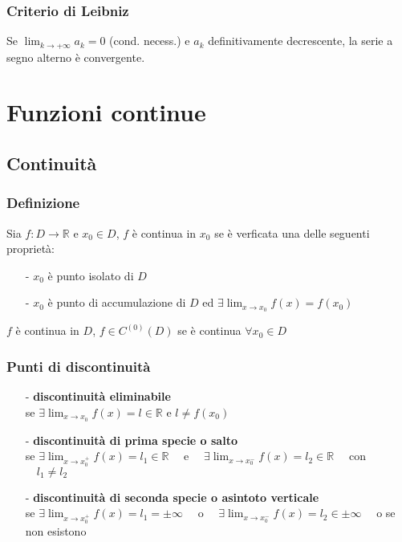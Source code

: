 \documentclass[a4paper]{article}
\newcommand\cont[2]{C^{(#1)} \left({#2}\right)}
\begin{document}
\subsubsection*{Criterio di Leibniz}
Se \(\displaystyle \lim_{k \to +\infty} a_k = 0\) (cond. necess.) e \(a_k\) definitivamente decrescente, la serie a segno alterno è convergente.

\newpage


\section{Funzioni continue}
\subsection{Continuità}
\subsubsection*{Definizione}
Sia \(f:D \to \mathbb{R}\) e \(x_0 \in D\), \(f\) è continua in \(x_0\) se è verficata una delle seguenti proprietà:
\begin{itemize}
	\item[-] \(x_0\) è punto isolato di \(D\)
	\item[-] \(x_0\) è punto di accumulazione di \(D\) ed \(\displaystyle \exists \lim_{x \to x_0} f(x) = f(x_0)\)
\end{itemize}
\(f\) è continua in \(D\), \(f \in \cont{0}{D}\) se è continua \(\forall x_0 \in D\)

\subsubsection*{Punti di discontinuità}
\begin{itemize}
	\item[-] \textbf{discontinuità eliminabile} \\
	se \(\displaystyle \exists \lim_{x \to x_0} f(x) = l \in \mathbb{R}\) e \(l \neq f(x_0)\)
	\item[-] \textbf{discontinuità di prima specie o salto} \\
	se \(\displaystyle \exists \lim_{x \to x_0^+} f(x) = l_1 \in \mathbb{R} \quad\) e \(\displaystyle \quad \exists \lim_{x \to x_0^-} f(x) = l_2 \in \mathbb{R} \quad\) con \(\quad l_1 \neq l_2\)
	\item[-] \textbf{discontinuità di seconda specie o asintoto verticale} \\
	se \(\displaystyle \exists \lim_{x \to x_0^+} f(x) = l_1 = \pm \infty \quad\) o \(\displaystyle \quad \exists \lim_{x \to x_0^-} f(x) = l_2 \in \pm \infty \quad\) o se non esistono
	
\end{itemize}
\end{document}
